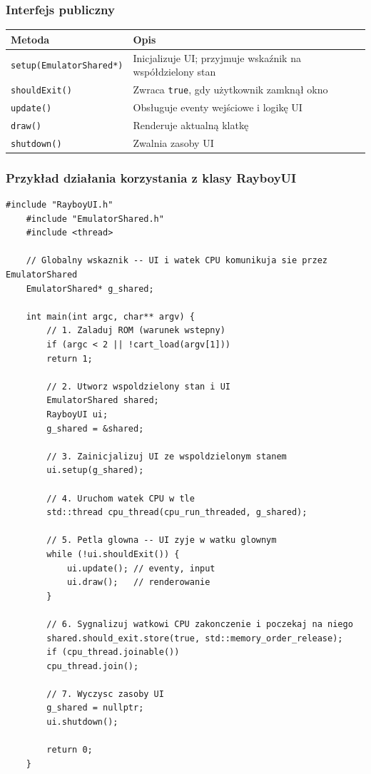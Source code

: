 \documentclass{article}
\begin{document}
\subsubsection{Interfejs publiczny}

\begin{center}
	\begin{tabular}{ll}
		\toprule
		\textbf{Metoda} & \textbf{Opis} \\
		\midrule
		\texttt{setup(EmulatorShared*)} & Inicjalizuje UI; przyjmuje wskaźnik na współdzielony stan \\
		\texttt{shouldExit()} & Zwraca \texttt{true}, gdy użytkownik zamknął okno \\
		\texttt{update()} & Obsługuje eventy wejściowe i logikę UI \\
		\texttt{draw()} & Renderuje aktualną klatkę \\
		\texttt{shutdown()} & Zwalnia zasoby UI \\
		\bottomrule
	\end{tabular}
\end{center}

\subsubsection{Przykład działania korzystania z klasy RayboyUI}

\begin{lstlisting}[style=cpp, caption={Minimalny przykład użycia klasy \texttt{RayboyUI}}]
	#include "RayboyUI.h"
	#include "EmulatorShared.h"
	#include <thread>
	
	// Globalny wskaznik -- UI i watek CPU komunikuja sie przez EmulatorShared
	EmulatorShared* g_shared;
	
	int main(int argc, char** argv) {
		// 1. Zaladuj ROM (warunek wstepny)
		if (argc < 2 || !cart_load(argv[1]))
		return 1;
		
		// 2. Utworz wspoldzielony stan i UI
		EmulatorShared shared;
		RayboyUI ui;
		g_shared = &shared;
		
		// 3. Zainicjalizuj UI ze wspoldzielonym stanem
		ui.setup(g_shared);
		
		// 4. Uruchom watek CPU w tle
		std::thread cpu_thread(cpu_run_threaded, g_shared);
		
		// 5. Petla glowna -- UI zyje w watku glownym
		while (!ui.shouldExit()) {
			ui.update(); // eventy, input
			ui.draw();   // renderowanie
		}
		
		// 6. Sygnalizuj watkowi CPU zakonczenie i poczekaj na niego
		shared.should_exit.store(true, std::memory_order_release);
		if (cpu_thread.joinable())
		cpu_thread.join();
		
		// 7. Wyczysc zasoby UI
		g_shared = nullptr;
		ui.shutdown();
		
		return 0;
	}
\end{lstlisting}
\end{document}
